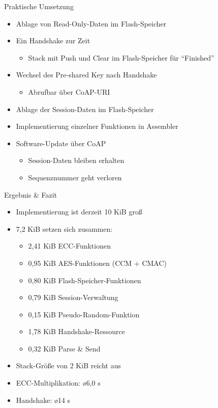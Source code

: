 \documentclass{beamer}
\begin{document}
\begin{frame}{Praktische Umsetzung}
  \begin{itemize}
    \item Ablage von Read-Only-Daten im Flash-Speicher
    \item Ein Handshake zur Zeit
    \begin{itemize}
     \item Stack mit Push und Clear im Flash-Speicher für "`Finished"'
    \end{itemize}
    \item Wechsel des Pre-shared Key nach Handshake
    \begin{itemize}
      \item Abrufbar über CoAP-URI
    \end{itemize}
    \item Ablage der Session-Daten im Flash-Speicher
    \item Implementierung einzelner Funktionen in Assembler
    \item Software-Update über CoAP
    \begin{itemize}
      \item Session-Daten bleiben erhalten
      \item Sequenznummer geht verloren
    \end{itemize}
  \end{itemize}
\end{frame}

\begin{frame}{Ergebnis \& Fazit}
  \begin{itemize}
    \item Implementierung ist derzeit 10 KiB groß
    \item 7,2 KiB setzen sich zusammen:
    \begin{itemize}
      \item 2,41 KiB ECC-Funktionen
      \item 0,95 KiB AES-Funktionen (CCM + CMAC)
      \item 0,80 KiB Flash-Speicher-Funktionen
      \item 0,79 KiB Session-Verwaltung
      \item 0,15 KiB Pseudo-Random-Funktion
      \item 1,78 KiB Handshake-Ressource
      \item 0,32 KiB Parse \& Send
    \end{itemize}
    \item Stack-Größe von 2 KiB reicht aus
    \item ECC-Multiplikation: \o 6,0 s
    \item Handshake: \o 14 s
  \end{itemize}
\end{frame}
\end{document}
